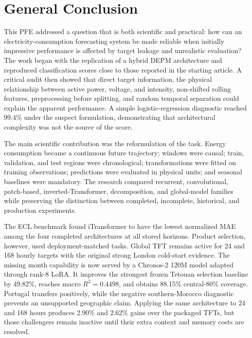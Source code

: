\chapter*{General Conclusion}

This PFE addressed a question that is both scientific and practical: how can an electricity-consumption forecasting system be made reliable when initially impressive performance is affected by target leakage and unrealistic evaluation? The work began with the replication of a hybrid DEPM architecture and reproduced classification scores close to those reported in the starting article. A critical audit then showed that direct target information, the physical relationship between active power, voltage, and intensity, non-shifted rolling features, preprocessing before splitting, and random temporal separation could explain the apparent performance. A simple logistic-regression diagnostic reached 99.4\% under the suspect formulation, demonstrating that architectural complexity was not the source of the score.

The main scientific contribution was the reformulation of the task. Energy consumption became a continuous future trajectory; windows were causal; train, validation, and test regions were chronological; transformations were fitted on training observations; predictions were evaluated in physical units; and seasonal baselines were mandatory. The research compared recurrent, convolutional, patch-based, inverted-Transformer, decomposition, and global-model families while preserving the distinction between completed, incomplete, historical, and production experiments.

The ECL benchmark found iTransformer to have the lowest normalized MAE among the four completed architectures at all stored horizons. Product selection, however, used deployment-matched tasks. Global TFT remains active for 24 and 168 hourly targets with the original strong London cold-start evidence. The missing month capability is now served by a Chronos-2 120M model adapted through rank-8 LoRA. It improves the strongest frozen Tetouan selection baseline by 49.82\%, reaches macro $R^2=0.4498$, and obtains 88.15\% central-80\% coverage. Portugal transfers positively, while the negative southern-Morocco diagnostic prevents an unsupported geographic claim. Applying the same architecture to 24 and 168 hours produces 2.90\% and 2.62\% gains over the packaged TFTs, but those challengers remain inactive until their extra context and memory costs are resolved.


